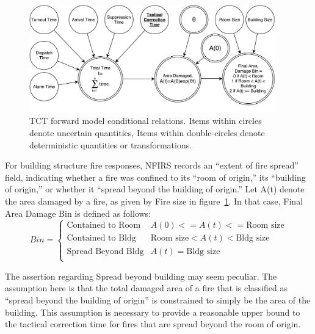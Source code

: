 \documentclass[12pt,oneside]{book}
\begin{document}
\begin{figure}[htb]
  \centering
  \includegraphics[width=0.95\textwidth]{./Figures/TCTforward}
  \caption{TCT forward model conditional relations. Items within circles denote uncertain quantities, Items within double-circles denote deterministic quantities or transformations.}
  \label{fig:TCTforward}
\end{figure}

For building structure fire responses, NFIRS records an ``extent of fire spread'' field, indicating whether a fire was confined to its ``room of origin,'' its ``building of origin,'' or whether it ``spread beyond the building of origin.'' Let A(t) denote the area damaged by a fire, as given by Fire size in figure~\ref{fig:TCTforward}. In that case, Final Area Damage Bin is defined as follows:
 \begin{displaymath}
   Bin = \left\{
     \begin{array}{lr}
       \text{Contained to Room} &  A(0) <= A(t) <= \text{Room size}\\
       \text{Contained to Bldg} &  \text{Room size} < A(t) < \text{Bldg size}\\
       \text{Spread Beyond Bldg} & A(t) = \text{Bldg size}\\
     \end{array}
   \right.
\end{displaymath} 

The assertion regarding Spread beyond building may seem peculiar. The assumption here is that the total damaged area of a fire that is classified as ``spread beyond the building of origin'' is constrained to simply be the area of the building. This assumption is necessary to provide a reasonable upper bound to the tactical correction time for fires that are spread beyond the room of origin. 
\end{document}
